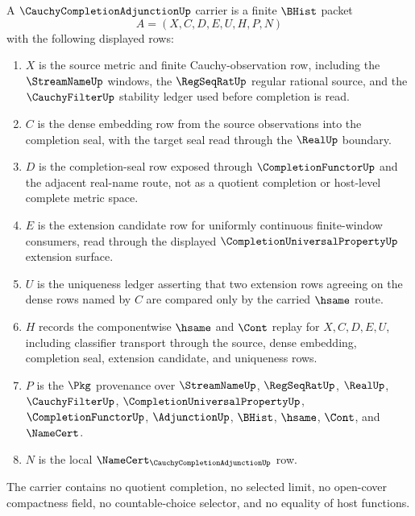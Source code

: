 \begin{definition}
\label{def:cauchy-completion-adjunction-carrier}
A $\CauchyCompletionAdjunctionUp$ carrier is a finite $\BHist$ packet
$$
A=(X,C,D,E,U,H,P,N)
$$
with the following displayed rows:
\begin{enumerate}
\item $X$ is the source metric and finite Cauchy-observation row, including the $\StreamNameUp$ windows, the $\RegSeqRatUp$ regular rational source, and the $\CauchyFilterUp$ stability ledger used before completion is read.
\item $C$ is the dense embedding row from the source observations into the completion seal, with the target seal read through the $\RealUp$ boundary.
\item $D$ is the completion-seal row exposed through $\CompletionFunctorUp$ and the adjacent real-name route, not as a quotient completion or host-level complete metric space.
\item $E$ is the extension candidate row for uniformly continuous finite-window consumers, read through the displayed $\CompletionUniversalPropertyUp$ extension surface.
\item $U$ is the uniqueness ledger asserting that two extension rows agreeing on the dense rows named by $C$ are compared only by the carried $\hsame$ route.
\item $H$ records the componentwise $\hsame$ and $\Cont$ replay for $X,C,D,E,U$, including classifier transport through the source, dense embedding, completion seal, extension candidate, and uniqueness rows.
\item $P$ is the $\Pkg$ provenance over $\StreamNameUp$, $\RegSeqRatUp$, $\RealUp$, $\CauchyFilterUp$, $\CompletionUniversalPropertyUp$, $\CompletionFunctorUp$, $\AdjunctionUp$, $\BHist$, $\hsame$, $\Cont$, and $\NameCert$.
\item $N$ is the local $\NameCert_{\CauchyCompletionAdjunctionUp}$ row.
\end{enumerate}
The carrier contains no quotient completion, no selected limit, no open-cover compactness field, no countable-choice selector, and no equality of host functions.
\end{definition}

